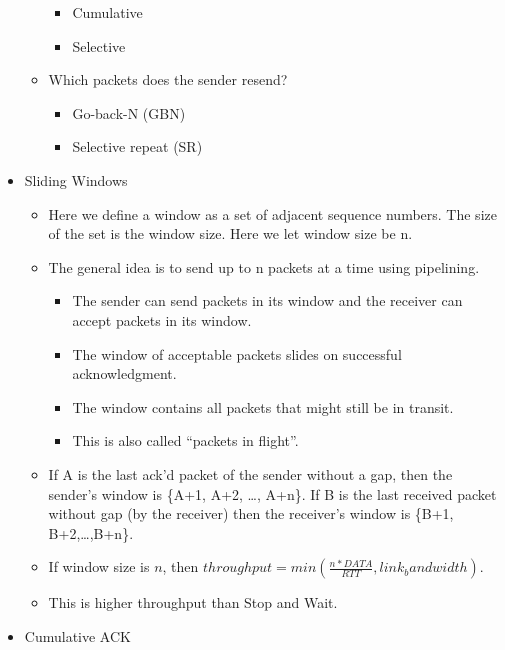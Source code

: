\documentclass[]{article}
\providecommand{\tightlist}{%
  \setlength{\itemsep}{0pt}\setlength{\parskip}{0pt}}
\begin{document}
\begin{itemize}
\begin{itemize}
    \begin{itemize}
    \tightlist
    \item
      Cumulative
    \item
      Selective
    \end{itemize}
  \item
    Which packets does the sender resend?

    \begin{itemize}
    \tightlist
    \item
      Go-back-N (GBN)
    \item
      Selective repeat (SR)
    \end{itemize}
  \end{itemize}
\item
  Sliding Windows

  \begin{itemize}
  \tightlist
  \item
    Here we define a window as a set of adjacent sequence numbers. The
    size of the set is the window size. Here we let window size be n.
  \item
    The general idea is to send up to n packets at a time using
    pipelining.

    \begin{itemize}
    \tightlist
    \item
      The sender can send packets in its window and the receiver can
      accept packets in its window.
    \item
      The window of acceptable packets slides on successful
      acknowledgment.
    \item
      The window contains all packets that might still be in transit.
    \item
      This is also called ``packets in flight''.
    \end{itemize}
  \item
    If A is the last ack'd packet of the sender without a gap, then the
    sender's window is \{A+1, A+2, \ldots{}, A+n\}. If B is the last
    received packet without gap (by the receiver) then the receiver's
    window is \{B+1, B+2,\ldots{},B+n\}.
  \item
    If window size is \(n\), then
    \(throughput = min(\frac{n * DATA}{RTT},  link_bandwidth)\).
  \item
    This is higher throughput than Stop and Wait.
  \end{itemize}
\item
  Cumulative ACK


\end{itemize}
\end{document}
